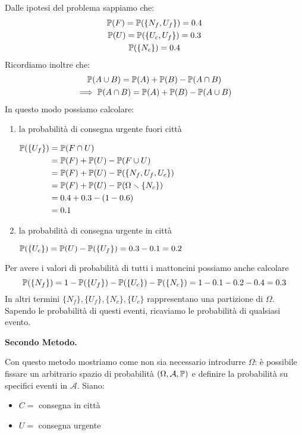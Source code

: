 Dalle ipotesi del problema sappiamo che:
\begin{gather*}
\P( F) =\P(\{N_{f} ,U_{f}\}) =0.4\\
\P( U) =\P(\{U_{c} ,U_{f}\}) =0.3\\
\P(\{N_{c}\}) =0.4
\end{gather*}
Ricordiamo inoltre che:
\begin{gather*}
\P( A\cup B) =\P( A) +\P( B) -\P( A\cap B)\\
\implies  \mathbb{P}( A\cap B) =\P( A) +\P( B) -\P( A\cup B)
\end{gather*}
In questo modo possiamo calcolare:
\begin{enumerate}
\item la probabilità di consegna urgente fuori città

$\begin{aligned}
\P(\{U_{f}\}) & =\P( F\cap U)\\
 & =\P( F) +\P( U) -\P( F\cup U)\\
 & =\P( F) +\P( U) -\P(\{N_{f} ,U_{f} ,U_{c}\})\\
 & =\P( F) +\P( U) -\P( \Omega \smallsetminus \{N_{c}\})\\
 & =0.4+0.3-( 1-0.6)\\
 & =0.1
\end{aligned}$
\item la probabilità di consegna urgente in città

$\P(\{U_{c}\}) =\P( U) -\P(\{U_{f}\}) =0.3-0.1=0.2$
\end{enumerate}
\begin{oss}
Per avere i valori di probabilità di tutti i mattoncini possiamo anche calcolare
\begin{equation*}
\P(\{N_{f}\}) =1-\P(\{U_{f}\}) -\P(\{U_{c}\}) -\P(\{N_{c}\}) =1-0.1-0.2-0.4=0.3
\end{equation*}
In altri termini $\{N_{f}\} ,\{U_{f}\} ,\{N_{c}\} ,\{U_{c}\}$ rappresentano una partizione di $\Omega $. Sapendo le probabilità di questi eventi, ricaviamo le probabilità di qualsiasi evento.
\end{oss}


\textbf{Secondo Metodo.}

Con questo metodo mostriamo come non sia necessario introdurre $\Omega $: è possibile fissare un arbitrario spazio di probabilità $( \Omega ,\mathcal{A} ,\P)$ e definire la probabilità su specifici eventi in $\mathcal{A}$. Siano:
\begin{itemize}
\item $C=$ consegna in città
\item $U=$ consegna urgente
\end{itemize}

